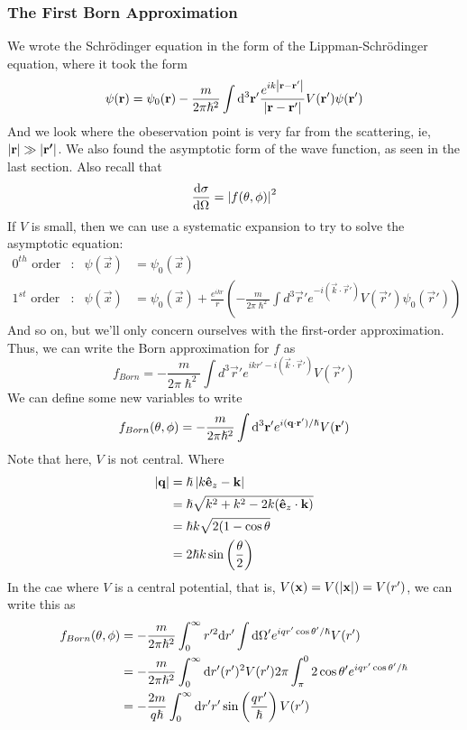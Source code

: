 \documentclass[a4paper]{article}
\begin{document}
\subsubsection{The First Born Approximation}
We wrote the Schr\"odinger equation in the form of the Lippman-Schr\"odinger
equation, where it took the form
\[
	\psi(\boldsymbol{\mathbf{r}}) = \psi_0(\boldsymbol{\mathbf{r}}) - \frac{m}{2\pi\hslash^2}
	\int\mathrm{d}^3\boldsymbol{\mathbf{r}}'\frac{e^{ik\left\lvert \boldsymbol{\mathbf{r}}-\boldsymbol{\mathbf{r}}'\right\rvert}}
	{\left\lvert \boldsymbol{\mathbf{r}}-\boldsymbol{\mathbf{r}}'\right\rvert}V(\boldsymbol{\mathbf{r}}')\psi(\boldsymbol{\mathbf{r}}')
\]
And we look where the obeservation point is very far from the scattering, ie,
$\left\lvert \boldsymbol{\mathbf{r}}\right\rvert\gg\left\lvert \boldsymbol{\mathbf{r'}}\right\rvert$. We also found the asymptotic form of the wave
function, as seen in the last section. Also recall that
\[
	\frac{\mathrm{d} \sigma}{\mathrm{d} \Omega} = \left\lvert f(\theta,\phi)\right\rvert^2
\]
If $V$ is small, then we can use a systematic expansion to try to solve the
asymptotic equation:
\begin{align*}
	0^{th}\text{ order}&: &
	\psi(\vec{x}) &= \psi_0(\vec{x})\\
	1^{st}\text{ order}&: &
	\psi(\vec{x}) &= \psi_0(\vec{x}) + \frac{e^{ikr}}{r}\left(
		-\frac{m}{2\pi\hslash^2}\int d^3\vec{r}'
		e^{-i(\vec{k}\cdot\vec{r}')} V(\vec{r}') \psi_0(\vec{r}')
	\right)
\end{align*}
And so on, but we'll only concern ourselves with the first-order approximation.
Thus, we can write the Born approximation for $f$ as
\[
	f_{Born} = -\frac{m}{2\pi\hslash^2}\int d^3\vec{r}'
	e^{ikr'-i(\vec{k}\cdot\vec{r}')} V(\vec{r}')
\]
We can define some new variables to write
\[
	f_{Born}(\theta,\phi) = -\frac{m}{2\pi\hslash^2}
	\int\mathrm{d}^3\boldsymbol{\mathbf{r}}' e^{i(\boldsymbol{\mathbf{q}}\cdot\boldsymbol{\mathbf{r}}')/\hslash}
	V(\boldsymbol{\mathbf{r}}')
\]
Note that here, $V$ is not central.
Where
\begin{align*}
	\left\lvert \boldsymbol{\mathbf{q}}\right\rvert &= \hslash\left\lvert k\boldsymbol{\mathbf{\hat{e}}}_z-\boldsymbol{\mathbf{k}}\right\rvert\\
	&= \hslash\sqrt{k^2+k^2-2k(\boldsymbol{\mathbf{\hat{e}}}_z\cdot\boldsymbol{\mathbf{k}})}\\
	&= \hslash k\sqrt{2(1-\cos\theta}\\
	&= 2\hslash k \sin\left(\frac{\theta}{2}\right)
\end{align*}
In the cae where $V$ is a central potential, that is,
$V(\boldsymbol{\mathbf{x}}) = V(\left\lvert \boldsymbol{\mathbf{x}}\right\rvert) = V(r')$, we can write this as
\begin{align*}
	f_{Born}(\theta,\phi) &= -\frac{m}{2\pi\hslash^2}
	\int_0^\infty r'^2 \mathrm{d} r'
	\int \mathrm{d}\Omega'e^{iqr'\cos\theta'/\hslash}V(r')\\
	&= -\frac{m}{2\pi\hslash^2} \int_0^\infty
	\mathrm{d} r'(r')^2V(r') 2\pi\int_\pi^02\cos\theta'
	e^{iqr'\cos\theta'/\hslash}\\
	&= -\frac{2m}{q\hslash}\int_0^\infty\mathrm{d} r' r'
	\sin\left(\frac{qr'}{\hslash}\right)V(r')
\end{align*}
\end{document}
